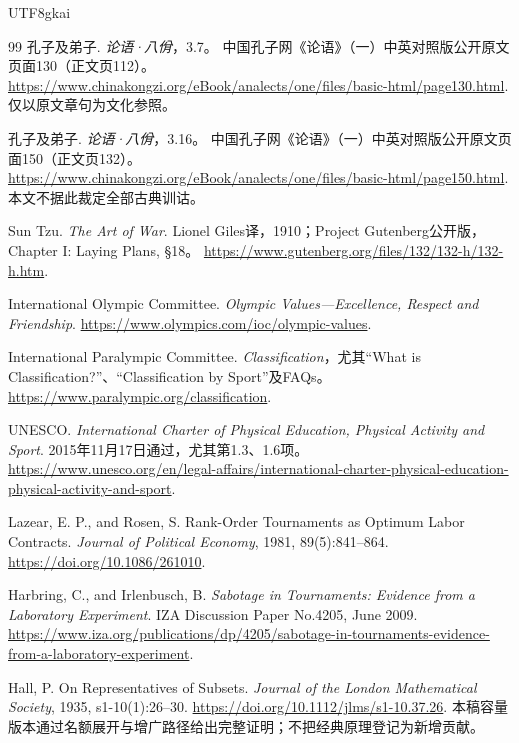 \documentclass[12pt,a4paper,openany]{report}
\begin{document}
\begin{CJK*}{UTF8}{gkai}
\begin{thebibliography}{99}
 孔子及弟子. \emph{论语·八佾}，3.7。
中国孔子网《论语》（一）中英对照版公开原文页面130（正文页112）。
\url{https://www.chinakongzi.org/eBook/analects/one/files/basic-html/page130.html}.
仅以原文章句为文化参照。

 孔子及弟子. \emph{论语·八佾}，3.16。
中国孔子网《论语》（一）中英对照版公开原文页面150（正文页132）。
\url{https://www.chinakongzi.org/eBook/analects/one/files/basic-html/page150.html}.
本文不据此裁定全部古典训诂。

 Sun Tzu. \emph{The Art of War}.
Lionel Giles译，1910；Project Gutenberg公开版，Chapter I: Laying Plans, \S18。
\url{https://www.gutenberg.org/files/132/132-h/132-h.htm}.


 International Olympic Committee.
\emph{Olympic Values---Excellence, Respect and Friendship}.
\url{https://www.olympics.com/ioc/olympic-values}.


 International Paralympic Committee.
\emph{Classification}，尤其“What is Classification?”、“Classification by Sport”及FAQs。
\url{https://www.paralympic.org/classification}.


 UNESCO.
\emph{International Charter of Physical Education, Physical Activity and Sport}.
2015年11月17日通过，尤其第1.3、1.6项。
\url{https://www.unesco.org/en/legal-affairs/international-charter-physical-education-physical-activity-and-sport}.


 Lazear, E. P., and Rosen, S.
Rank-Order Tournaments as Optimum Labor Contracts.
\emph{Journal of Political Economy}, 1981, 89(5):841--864.
\url{https://doi.org/10.1086/261010}.


 Harbring, C., and Irlenbusch, B.
\emph{Sabotage in Tournaments: Evidence from a Laboratory Experiment}.
IZA Discussion Paper No.4205, June 2009.
\url{https://www.iza.org/publications/dp/4205/sabotage-in-tournaments-evidence-from-a-laboratory-experiment}.


 Hall, P. On Representatives of Subsets.
\emph{Journal of the London Mathematical Society}, 1935, s1-10(1):26--30.
\url{https://doi.org/10.1112/jlms/s1-10.37.26}.
本稿容量版本通过名额展开与增广路径给出完整证明；不把经典原理登记为新增贡献。
\end{thebibliography}
\endgroup
\end{CJK*}
\end{document}
